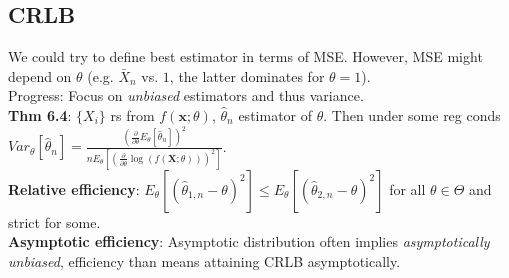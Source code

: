 \subsection{CRLB}
We could try to define best estimator in terms of MSE. However, MSE might depend on $\theta$ (e.g. $\bar{X}_n$ vs. $1$, the latter dominates for $\theta = 1$).\\
Progress: Focus on \textit{unbiased} estimators and thus variance.\\
\textbf{Thm 6.4}: $\{X_i\}$ rs from $f(\textbf{x};\theta)$, $\hat{\theta}_n$ estimator of $\theta$. Then under some reg conds $Var_\theta[\hat{\theta}_n] = \frac{(\frac{\partial}{\partial\theta}E_\theta[\hat{\theta}_n])^2}{nE_\theta[(\frac{\partial}{\partial\theta}\log(f(\textbf{X};\theta)))^2]}$.\\
\textbf{Relative efficiency}: $E_\theta[(\hat{\theta}_{1,n}-\theta)^2] \leq E_\theta[(\hat{\theta}_{2,n}-\theta)^2]$ for all $\theta\in\Theta$ and strict for some.\\
\textbf{Asymptotic efficiency}: Asymptotic distribution often implies \textit{asymptotically unbiased}, efficiency than means attaining CRLB asymptotically. %